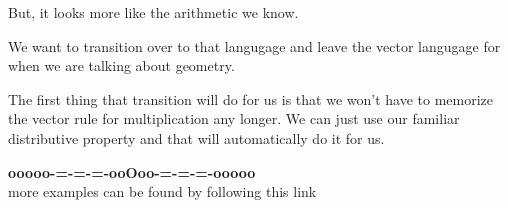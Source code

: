 \documentclass{ximera}
\begin{document}
But, it looks more like the arithmetic we know.  


We want to transition over to that langugage and leave the vector langugage for when we are talking about geometry.


The first thing that transition will do for us is that we won't have to memorize the vector rule for multiplication any longer.  We can just use our familiar distributive property and that will automatically do it for us.























\begin{center}
\textbf{\textcolor{green!50!black}{ooooo-=-=-=-ooOoo-=-=-=-ooooo}} \\

more examples can be found by following this link\\ 

\end{center}
\end{document}
